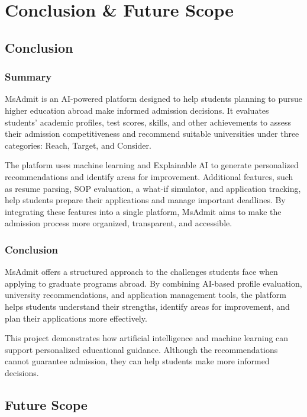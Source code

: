 
\chapter{Conclusion \& Future Scope} \label{chap6}
\newpage

\justify
\section{Conclusion} \label{sec:6.1}
\subsection{Summary}


MsAdmit is an AI-powered platform designed to help students planning to pursue higher education abroad make informed admission decisions. It evaluates students' academic profiles, test scores, skills, and other achievements to assess their admission competitiveness and recommend suitable universities under three categories: Reach, Target, and Consider.

The platform uses machine learning and Explainable AI to generate personalized recommendations and identify areas for improvement. Additional features, such as resume parsing, SOP evaluation, a what-if simulator, and application tracking, help students prepare their applications and manage important deadlines. By integrating these features into a single platform, MsAdmit aims to make the admission process more organized, transparent, and accessible.
\subsection{Conclusion}
MsAdmit offers a structured approach to the challenges students face when applying to graduate programs abroad. By combining AI-based profile evaluation, university recommendations, and application management tools, the platform helps students understand their strengths, identify areas for improvement, and plan their applications more effectively.

This project demonstrates how artificial intelligence and machine learning can support personalized educational guidance. Although the recommendations cannot guarantee admission, they can help students make more informed decisions. 
\justify

\section{Future Scope} \label{sec:6.2}


